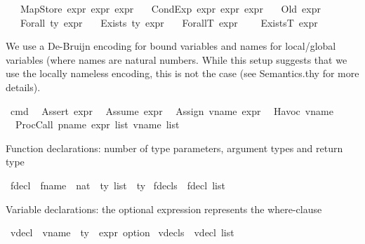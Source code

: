 \begin{isabellebody}
\ \ {\isacharbar}{\kern0pt}\ MapStore\ expr\ expr\ expr\isanewline
\ \ {\isacharbar}{\kern0pt}\ CondExp\ expr\ expr\ expr\isanewline
\ \ {\isacharbar}{\kern0pt}\ Old\ expr\isanewline
\isanewline
\ \ {\isacharbar}{\kern0pt}\ Forall\ ty\ expr\isanewline
\ \ {\isacharbar}{\kern0pt}\ Exists\ ty\ expr\isanewline
\isanewline
\ \ {\isacharbar}{\kern0pt}\ ForallT\ expr\ \isanewline
\ \ {\isacharbar}{\kern0pt}\ ExistsT\ expr%
\begin{isamarkuptext}%
We use a De-Bruijn encoding for bound variables  and names for local/global variables 
 (where names are natural numbers. While this setup suggests that we use the locally 
nameless encoding, this is not the case (see Semantics.thy for more details).%
\end{isamarkuptext}\isamarkuptrue%
\isamarkupfalse%
\ cmd\isanewline
\ {\isacharequal}{\kern0pt}\ Assert\ expr\isanewline
\ {\isacharbar}{\kern0pt}\ Assume\ expr\isanewline
\ {\isacharbar}{\kern0pt}\ Assign\ vname\ expr\isanewline
\ {\isacharbar}{\kern0pt}\ Havoc\ vname\isanewline
\ {\isacharbar}{\kern0pt}\ ProcCall\ pname\ {\isachardoublequoteopen}expr\ list{\isachardoublequoteclose}\ {\isachardoublequoteopen}vname\ list{\isachardoublequoteclose}%
\begin{isamarkuptext}%
Function declarations: number of type parameters, argument types and return type%
\end{isamarkuptext}\isamarkuptrue%
\isamarkupfalse%
\ fdecl\ {\isacharequal}{\kern0pt}\ {\isachardoublequoteopen}{\isacharparenleft}{\kern0pt}fname\ {\isasymtimes}\ nat\ {\isasymtimes}\ ty\ list\ {\isasymtimes}\ ty{\isacharparenright}{\kern0pt}{\isachardoublequoteclose}\isanewline
{}\isamarkupfalse%
\ fdecls\ {\isacharequal}{\kern0pt}\ {\isachardoublequoteopen}fdecl\ list{\isachardoublequoteclose}%
\begin{isamarkuptext}%
Variable declarations: the optional expression represents the where-clause%
\end{isamarkuptext}\isamarkuptrue%
\isamarkupfalse%
\ vdecl\ {\isacharequal}{\kern0pt}\ {\isachardoublequoteopen}vname\ {\isasymtimes}\ ty\ {\isasymtimes}\ {\isacharparenleft}{\kern0pt}expr\ option{\isacharparenright}{\kern0pt}{\isachardoublequoteclose}\isanewline
{}\isamarkupfalse%
\ vdecls\ {\isacharequal}{\kern0pt}\ {\isachardoublequoteopen}vdecl\ list{\isachardoublequoteclose}%

\end{isabellebody}
